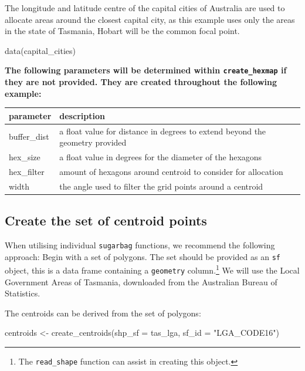 The longitude and latitude centre of the capital cities of Australia are
used to allocate areas around the closest capital city, as this example
uses only the areas in the state of Tasmania, Hobart will be the common
focal point.

\begin{Schunk}
\begin{Sinput}
data(capital_cities)
\end{Sinput}
\end{Schunk}

\textbf{The following parameters will be determined within
\texttt{create\_hexmap} if they are not provided. They are created
throughout the following example:}

\begin{Schunk}

\begin{tabular}{l|l}
\hline
parameter & description\\
\hline
buffer\_dist & a float value for distance in degrees to extend beyond the geometry provided\\
\hline
hex\_size & a float value in degrees for the diameter of the hexagons\\
\hline
hex\_filter & amount of hexagons around centroid to consider for allocation\\
\hline
width & the angle used to filter the grid points around a centroid\\
\hline
\end{tabular}

\end{Schunk}

\hypertarget{create-the-set-of-centroid-points}{%
\subsection{Create the set of centroid
points}\label{create-the-set-of-centroid-points}}

When utilising individual \texttt{sugarbag} functions, we recommend the
following approach: Begin with a set of polygons. The set should be
provided as an \texttt{sf} object, this is a data frame containing a
\texttt{geometry} column.\footnote{The \texttt{read\_shape} function can
  assist in creating this object.} We will use the Local Government
Areas of Tasmania, downloaded from the Australian Bureau of Statistics.

The centroids can be derived from the set of polygons:

\begin{Schunk}
\begin{Sinput}
centroids <- create_centroids(shp_sf = tas_lga, sf_id = "LGA_CODE16")
\end{Sinput}
\end{Schunk}


